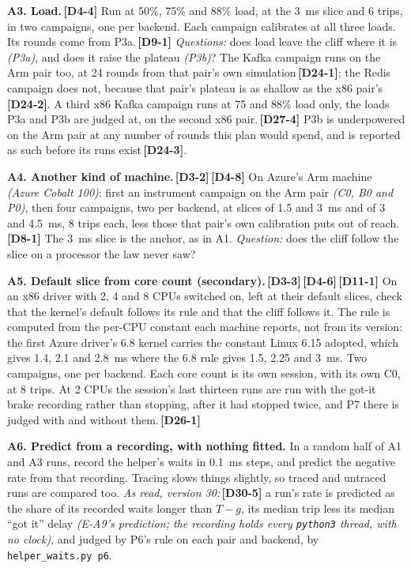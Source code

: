\documentclass[11pt]{article}
\newcommand{\gl}[1]{{\color{soft}\itshape\small (#1)}}
\newcommand{\chgold}[1]{\,{\color{oldcol}\bfseries\footnotesize[#1]}}
\begin{document}
\textbf{A3. Load.}\chgold{D4-4} Run at 50\%, 75\% and 88\% load, at the 3~ms slice and 6 trips, in two campaigns, one per backend. Each campaign calibrates at all three loads. Its rounds come from P3a.\chgold{D9-1} \emph{Questions:} does load leave the cliff where it is \gl{P3a}, and does it raise the plateau \gl{P3b}? The Kafka campaign runs on the Arm pair too, at 24 rounds from that pair's own simulation\chgold{D24-1}; the Redis campaign does not, because that pair's plateau is as shallow as the x86 pair's\chgold{D24-2}. A third x86 Kafka campaign runs at 75 and 88\% load only, the loads P3a and P3b are judged at, on the second x86 pair.\chgold{D27-4} P3b is underpowered on the Arm pair at any number of rounds this plan would spend, and is reported as such before its runs exist\chgold{D24-3}.

\textbf{A4. Another kind of machine.}\chgold{D3-2}\chgold{D4-8} On Azure's Arm machine \gl{Azure Cobalt 100}: first an instrument campaign on the Arm pair \gl{C0, B0 and P0}, then four campaigns, two per backend, at slices of 1.5 and 3~ms and of 3 and 4.5~ms, 8 trips each, less those that pair's own calibration puts out of reach.\chgold{D8-1} The 3~ms slice is the anchor, as in A1. \emph{Question:} does the cliff follow the slice on a processor the law never saw?

\textbf{A5. Default slice from core count (secondary).}\chgold{D3-3}\chgold{D4-6}\chgold{D11-1} On an x86 driver with 2, 4 and 8 CPUs switched on, left at their default slices, check that the kernel's default follows its rule and that the cliff follows it. The rule is computed from the per-CPU constant each machine reports, not from its version: the first Azure driver's 6.8 kernel carries the constant Linux 6.15 adopted, which gives 1.4, 2.1 and 2.8~ms where the 6.8 rule gives 1.5, 2.25 and 3~ms. Two campaigns, one per backend. Each core count is its own session, with its own C0, at 8 trips. At 2 CPUs the session's last thirteen runs are run with the got-it brake recording rather than stopping, after it had stopped twice, and P7 there is judged with and without them.\chgold{D26-1}

\textbf{A6. Predict from a recording, with nothing fitted.} In a random half of A1 and A3 runs, record the helper's waits in 0.1~ms steps, and predict the negative rate from that recording. Tracing slows things slightly, so traced and untraced runs are compared too. \emph{As read, version 30:}\chgold{D30-5} a run's rate is predicted as the share of its recorded waits longer than $T - g$, its median trip less its median ``got it'' delay \gl{E-A9's prediction; the recording holds every \texttt{python3} thread, with no clock}, and judged by P6's rule on each pair and backend, by \texttt{helper\_waits.py p6}.
\end{document}
